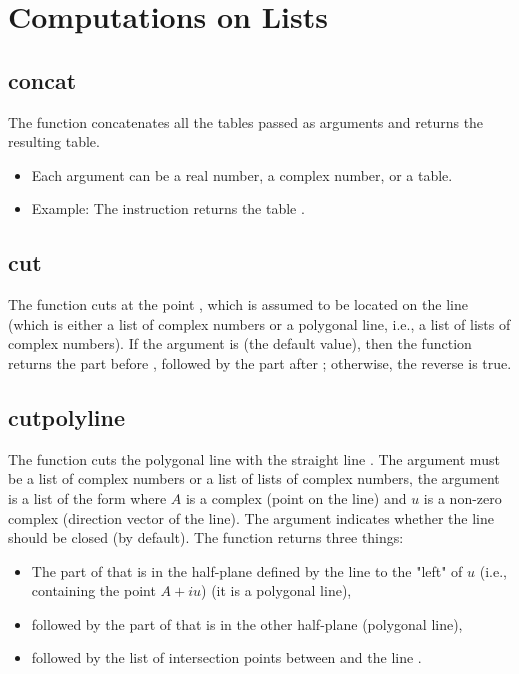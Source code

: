 \section{Computations on Lists}

\subsection{concat}

The function  concatenates all the tables passed as arguments and returns the resulting table.

\begin{itemize}
    \item Each argument can be a real number, a complex number, or a table.
    \item Example: The instruction  returns the table .
\end{itemize}

\subsection{cut}

The function  cuts  at the point , which is assumed to be located on the line  (which is either a list of complex numbers or a polygonal line, i.e., a list of lists of complex numbers). If the argument  is \false (the default value), then the function returns the part before , followed by the part after ; otherwise, the reverse is true.

\subsection{cutpolyline}

The function  cuts the polygonal line  with the straight line . The argument  must be a list of complex numbers or a list of lists of complex numbers, the argument  is a list of the form  where $A$ is a complex (point on the line) and $u$ is a non-zero complex (direction vector of the line). The argument  indicates whether the line  should be closed (\false by default). The function returns three things:
\begin{itemize}
    \item The part of  that is in the half-plane defined by the line to the "left" of $u$ (i.e., containing the point $A+iu$) (it is a polygonal line),
    \item followed by the part of  that is in the other half-plane (polygonal line),
    \item followed by the list of intersection points between  and the line .
\end{itemize}


